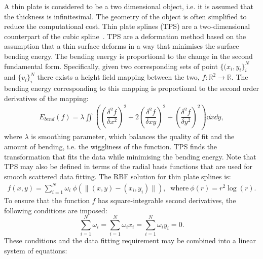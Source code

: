 A thin plate is considered to be a two dimensional object, i.e. it is assumed that the thickness is infinitesimal. The geometry of the object is often simplified to reduce the computational cost. Thin plate splines (TPS) are a two-dimensional counterpart of the cubic spline~\cite{Sibson:1991}. TPS are a deformation method based on the assumption that a thin surface deforms in a way that minimises the surface bending energy. The bending energy is proportional to the change in the second fundamental form. Specifically, given two corresponding sets of point $\{(x_i, y_i\}_i^N$ and $\{v_i\}_i^N$ there exists a height field mapping between the two, $f: \mathbb{R}^2 \to \mathbb{R}$. The bending energy corresponding to this mapping is proportional to the second order derivatives of the mapping:
\begin{equation}
\begin{aligned}
	E_{bend}(f) = \lambda \iint \left( \left( \dfrac{\delta^2f}{\delta x^2} \right)^2 +  2 \left( \dfrac{\delta^2f}{\delta x y} \right)^2 +  \left( \dfrac{\delta^2f}{\delta y^2} \right)^2 \right) \dd x \dd y,
\end{aligned}
\end{equation} where $\lambda$ is smoothing parameter, which balances the quality of fit and the amount of bending, i.e. the wiggliness of the function. TPS finds the transformation that fits the data while minimising the bending energy. Note that TPS may also be defined in terms of the radial basis functions that are used for smooth scattered data fitting. The RBF solution for thin plate splines is:
\begin{equation}
\begin{aligned}
	f(x,y) = \sum_{i=1}^N \omega_i \: \phi(\|(x,y) - (x_i,y_i)\|), \: \text{ where} \: \phi(r) = r^2 \log(r).
\end{aligned}
\end{equation} To ensure that the function $f$ has square-integrable second derivatives, the following conditions are imposed:
\begin{equation}
	\sum_{i=1}^N \omega_i = \sum_{i=1}^N \omega_i x_i = \sum_{i=1}^N \omega_i y_i = 0.\label{eq:TPSrestrictions}
\end{equation} These conditions and the data fitting requirement may be combined into a linear system of equations:
